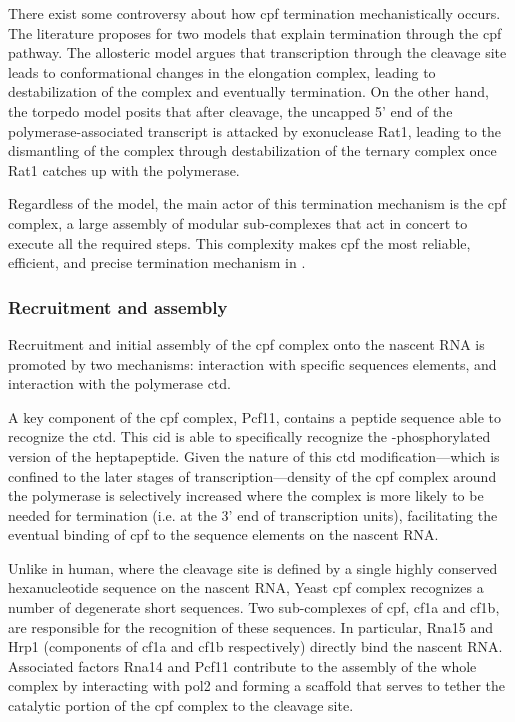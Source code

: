There exist some controversy about how \gls{cpf} termination mechanistically occurs.
The literature proposes for two models that explain termination through the \gls{cpf} pathway.
The allosteric model argues that transcription through the cleavage site leads to conformational changes in the elongation complex, leading to destabilization of the complex and eventually termination.
On the other hand, the torpedo model posits that after cleavage, the uncapped 5' end of the polymerase-associated transcript is attacked by exonuclease Rat1, leading to the dismantling of the complex through destabilization of the ternary complex once Rat1 catches up with the polymerase.

Regardless of the model, the main actor of this termination mechanism is the \gls{cpf} complex, a large assembly of modular sub-complexes that act in concert to execute all the required steps. 
This complexity makes \gls{cpf} the most reliable, efficient, and precise termination mechanism in \cer{}.

\subsubsection{Recruitment and assembly}
Recruitment and initial assembly of the \gls{cpf} complex onto the nascent RNA is promoted by two mechanisms: interaction with specific sequences elements, and interaction with the polymerase \gls{ctd}.

A key component of the \gls{cpf} complex, Pcf11, contains a peptide sequence able to recognize the \gls{ctd}. This \gls{cid} is able to specifically recognize the \sert{}-phosphorylated version of the heptapeptide.
Given the nature of this \gls{ctd} modification---which is confined to the later stages of transcription---density of the \gls{cpf} complex around the polymerase is selectively increased where the complex is more likely to be needed for termination (i.e. at the 3' end of transcription units), facilitating the eventual binding of \gls{cpf} to the sequence elements on the nascent RNA.

Unlike in human, where the cleavage site is defined by a single highly conserved hexanucleotide sequence on the nascent RNA, Yeast \gls{cpf} complex recognizes a number of degenerate short sequences.
Two sub-complexes of \gls{cpf}, \gls{cf1a} and \gls{cf1b}, are responsible for the recognition of these sequences.
In particular, Rna15 and Hrp1 (components of \gls{cf1a} and \gls{cf1b} respectively) directly bind the nascent RNA.
Associated factors Rna14 and Pcf11 contribute to the assembly of the whole complex by interacting with \gls{pol2} and forming a scaffold that serves to tether the catalytic portion of the \gls{cpf} complex to the cleavage site.

